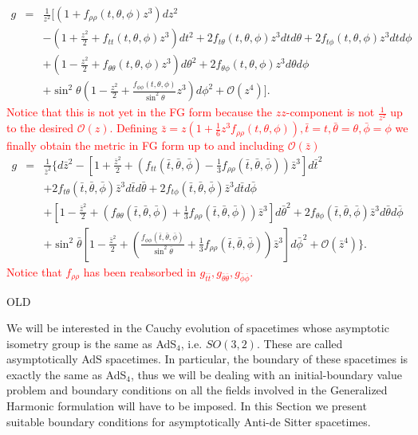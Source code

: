 \documentclass[a4paper,11pt]{article}
\begin{document}
\begin{eqnarray}
g&=&\frac{1}{z^2}\biggl[ 
\left(1+f_{\rho\rho}(t,\theta,\phi)z^3\right)dz^2 \nonumber \\
&&- \left(1+\frac{z^2}{2}+f_{tt}(t,\theta,\phi)z^3\right)dt^2+ 2 f_{t\theta}(t,\theta,\phi)z^3dt d\theta + 2 f_{t\phi}(t,\theta,\phi) z^3dt d\phi  \nonumber \\
&&+  \left(1-\frac{z^2}{2}+f_{\theta\theta}(t,\theta,\phi)z^3 \right)d\theta^2+ 2 f_{\theta\phi}(t,\theta,\phi) z^3d\theta d\phi \nonumber\\
&&+  \sin^2\theta \left(1-\frac{z^2}{2}+\frac{f_{\phi\phi}(t,\theta,\phi)}{\sin^2\theta} z^3 \right)d\phi^2+\mathcal{O}(z^4)
\biggr].
\end{eqnarray}
\textcolor{red}{Notice that this is not yet in the FG form because the $zz$-component is not $\frac{1}{z^2}$ up to the desired $\mathcal{O}(z)$. Defining $\bar{z}=z\left(1+\frac{1}{6}z^3f_{\rho\rho}(t,\theta,\phi)\right),\bar{t}=t,\bar{\theta}=\theta,\bar{\phi}=\phi$ we finally obtain the metric in FG form up to and including $\mathcal{O}(\bar{z})$}
\begin{eqnarray}
g&=&\frac{1}{\bar{z}^2}\biggl\{ d\bar{z}^2- \left[1+\frac{\bar{z}^2}{2}+\left(f_{tt}(\bar{t},\bar{\theta},\bar{\phi})-\frac{1}{3}f_{\rho\rho}(\bar{t},\bar{\theta},\bar{\phi})\right)\bar{z}^3 \right]d\bar{t}^2 \nonumber \\
&&+ 2 f_{t\theta}(\bar{t},\bar{\theta},\bar{\phi})\bar{z}^3d\bar{t} d\bar{\theta} + 2 f_{t\phi}(\bar{t},\bar{\theta},\bar{\phi}) \bar{z}^3d\bar{t} d\bar{\phi}  \nonumber \\
&&+  \left[1-\frac{\bar{z}^2}{2}+\left(f_{\theta\theta}(\bar{t},\bar{\theta},\bar{\phi})+\frac{1}{3}f_{\rho\rho}(\bar{t},\bar{\theta},\bar{\phi})\right)\bar{z}^3 \right]d\bar{\theta}^2+ 2 f_{\theta\phi}(\bar{t},\bar{\theta},\bar{\phi}) \bar{z}^3d\bar{\theta} d\bar{\phi} \nonumber\\
&&+   \sin^2\bar{\theta} \left[1-\frac{\bar{z}^2}{2}+\left(\frac{f_{\phi\phi}(\bar{t},\bar{\theta},\bar{\phi})}{ \sin^2\bar{\theta}}+\frac{1}{3}f_{\rho\rho}(\bar{t},\bar{\theta},\bar{\phi})\right)\bar{z}^3\right]d\bar{\phi}^2+\mathcal{O}(\bar{z}^4)
\biggr\}.
\end{eqnarray}
\textcolor{red}{Notice that $f_{\rho\rho}$ has been reabsorbed in $g_{\bar{t}\bar{t}},g_{\bar{\theta}\bar{\theta}},g_{\bar{\phi}\bar{\phi}}$.}


\iffalse
OLD

We will be interested in the Cauchy evolution of spacetimes whose asymptotic isometry group is the same as AdS$_4$, i.e. $SO(3,2)$. These are called asymptotically AdS spacetimes. In particular, the boundary of these spacetimes is exactly the same as AdS$_4$, thus we will be dealing with an initial-boundary value problem and boundary conditions on all the fields involved in the Generalized Harmonic formulation will have to be imposed.
In this Section we present suitable boundary conditions for asymptotically Anti-de Sitter spacetimes.
\end{document}
